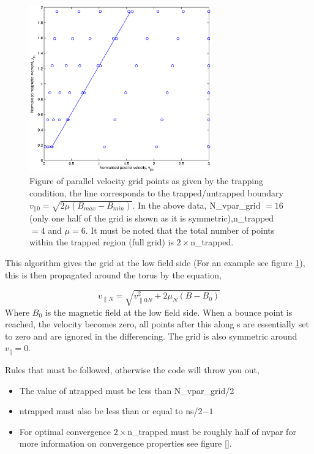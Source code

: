 \documentclass{report}
\begin{document}
\begin{figure}[here!]
\begin{center}
\includegraphics[width=0.7\textwidth]{traplowfield.eps}
\caption{Figure of parallel velocity grid points as given by the trapping condition, the line corresponds to the trapped/untrapped boundary $v_{||0} = \sqrt{2\mu(B_{max}-B_{min})}$.  In the above data, N\_vpar\_grid $= 16$ (only one half of the grid is shown as it is symmetric),n\_trapped $= 4$ and $\mu = 6$. It must be noted that the total number of points within the trapped region (full grid) is $2\times$n\_trapped.}
\label{lowfieldsidetrap}
\end{center}
\end{figure}

This algorithm gives the grid at the low field side (For an example see figure \ref{lowfieldsidetrap}), this is then propagated around the torus by the equation,

\begin{equation}
v_{\parallel N} = \sqrt{v_{\parallel 0 N}^{2} + 2\mu_{N}(B - B_{0})}
\end{equation}
\noindent
Where $B_{0}$ is the magnetic field at the low field side.  When a bounce point is reached, the velocity becomes zero, all points after this along s are essentially set to zero and are ignored in the differencing.  The grid is also symmetric around $v_{\parallel}=0$.


Rules that must be followed, otherwise the code will throw you out,
\begin{itemize}
\item The value of ntrapped must be less than N\_vpar\_grid/2
\item ntrapped must also be less than or equal to ns/2$-1$
\item For optimal convergence $2\times$n\_trapped must be roughly half of nvpar for more information on convergence properties see figure \ref{}.
\end{itemize}


\printindex
\end{document}
